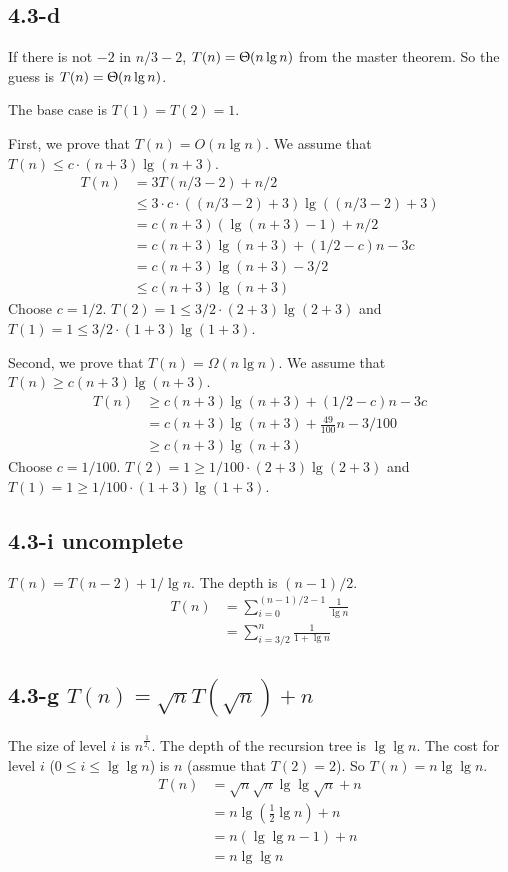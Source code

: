 \documentclass{book}
\begin{document}
\begin{CJK}{UTF8}{gkai}
\subsection*{4.3-d}
If there is not $-2$ in $n/3-2$, $T(n) = \Uptheta(n\lg n)$ from the master
theorem. So the guess is $T(n)=\Uptheta(n\lg n)$. 

The base case is $T(1)=T(2)=1$.

First, we prove that
$T(n)=O(n\lg n)$. We assume that $T(n) \le c\cdot (n+3)\lg(n+3)$.
\begin{align*}
T(n) & = 3T(n/3-2) + n/2 \\
& \le 3\cdot c\cdot ((n/3-2)+3)\lg((n/3-2)+3) \\
& = c(n+3)(\lg(n+3) - 1) + n/2 \\
& = c(n+3)\lg(n+3) + (1/2-c)n- 3c \\
& = c(n+3)\lg(n+3) - 3/2 \\
& \le c(n+3)\lg(n+3) 
\end{align*}
Choose $c=1/2$. $T(2) = 1 \le 3/2\cdot (2+3)\lg(2+3)$ and $T(1) = 1 \le
3/2\cdot (1+3)\lg(1+3)$.

Second, we prove that $T(n) = \Omega(n\lg n)$. We assume that 
$T(n) \ge c(n+3)\lg(n+3)$.
\begin{align*}
T(n) & \ge c(n+3)\lg(n+3) + (1/2-c)n - 3c \\
& = c(n+3)\lg(n+3) + \frac{49}{100}n-3/100 \\
& \ge c(n+3)\lg(n+3)
\end{align*}
Choose $c=1/100$. $T(2) = 1 \ge 1/100\cdot(2+3)\lg(2+3)$ and 
$T(1) = 1 \ge 1/100\cdot(1+3)\lg(1+3)$.

\subsection*{4.3-i uncomplete}
$T(n) = T(n-2) + 1/\lg n$. The depth is $(n-1)/2$.
\begin{align*}
T(n) &= \sum_{i=0}^{(n-1)/2-1} \frac{1}{\lg n} \\
& = \sum_{i=3/2}^{n}\frac{1}{1 + \lg n}
\end{align*}

\subsection*{4.3-g $T(n) = \sqrt{n}T(\sqrt{n}) + n$}
The size of level $i$ is $n^{\frac{1}{2_i}}$. The depth of the recursion tree is 
$\lg\lg n$. The cost for level $i$ ($0 \le i \le \lg\lg n $) is $n$ (assmue that 
$T(2) = 2$). So $T(n) = n\lg\lg n$.
\begin{align*}
T(n) &= \sqrt{n}\sqrt{n}\lg\lg{\sqrt{n}} + n \\
&= n\lg(\frac{1}{2}\lg{n}) + n \\
&= n(\lg\lg{n} - 1) + n \\
&= n\lg\lg{n}
\end{align*}


\end{CJK}
\end{document}
